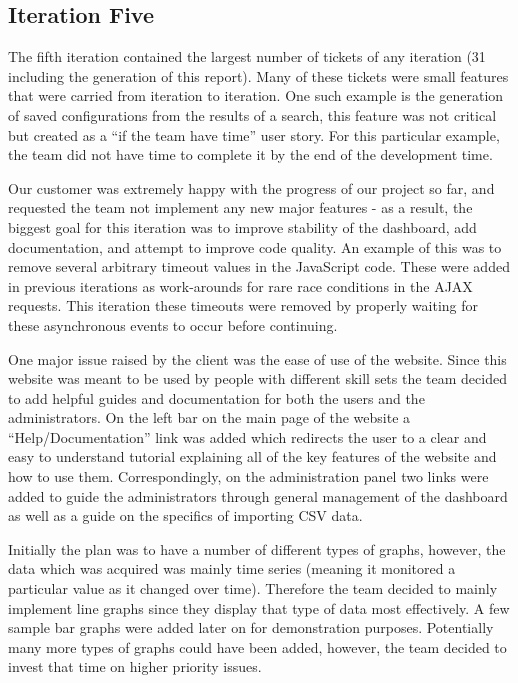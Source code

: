 \documentclass{l3proj}
\begin{document}
\subsection{Iteration Five}
\label{sec:development:iteration-five}

The fifth iteration contained the largest number of tickets of any iteration (31 including the generation of this report). Many of these tickets were small features that were carried from iteration to iteration. One such example is the generation of saved configurations from the results of a search, this feature was not critical but created as a ``if the team have time'' user story. For this particular example, the team did not have time to complete it by the end of the development time.

Our customer was extremely happy with the progress of our project so far, and requested the team not implement any new major features - as a result, the biggest goal for this iteration was to improve stability of the dashboard, add documentation, and attempt to improve code quality. An example of this was to remove several arbitrary timeout values in the JavaScript code. These were added in previous iterations as work-arounds for rare race conditions in the AJAX requests. This iteration these timeouts were removed by properly waiting for these asynchronous events to occur before continuing.

One major issue raised by the client was the ease of use of the website. Since this website was meant to be used by people with different skill sets the team decided to add helpful guides and documentation for both the users and the administrators. On the left bar on the main page of the website a ``Help/Documentation'' link was added which redirects the user to a clear and easy to understand tutorial explaining all of the key features of the website and how to use them. Correspondingly, on the administration panel two links were added to guide the administrators through general management of the dashboard as well as a guide on the specifics of importing CSV data.

Initially the plan was to have a number of different types of graphs, however, the data which was acquired was mainly time series (meaning it monitored a particular value as it changed over time). Therefore the team decided to mainly implement line graphs since they display that type of data most effectively. A few sample bar graphs were added later on for demonstration purposes. Potentially many more types of graphs could have been added, however, the team decided to invest that time on higher priority issues.
\end{document}
